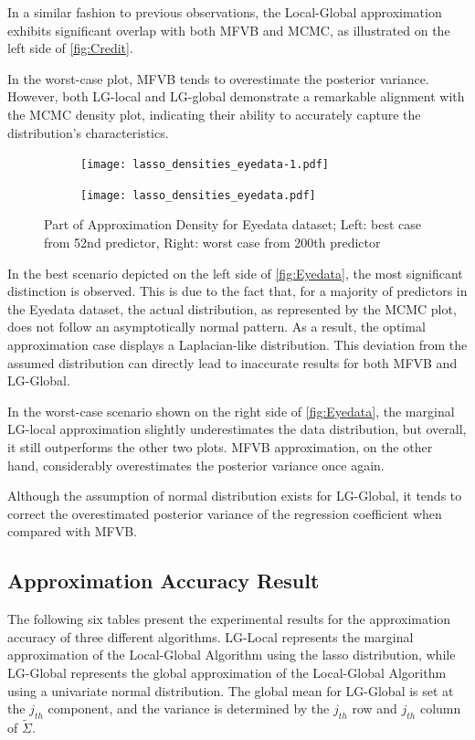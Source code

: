 In a similar fashion to previous observations, the Local-Global approximation exhibits significant overlap with both MFVB and MCMC, as illustrated on the left side of \autoref{fig:Credit}.

In the worst-case plot, MFVB tends to overestimate the posterior variance. However, both LG-local and LG-global demonstrate a remarkable alignment with the MCMC density plot, indicating their ability to accurately capture the distribution's characteristics.

\begin{figure}[h]
	\begin{subfigure}{0.5\textwidth}
		\centering
		\texttt{[image: lasso\_densities\_eyedata-1.pdf]}
	\end{subfigure}
	\begin{subfigure}{0.5\textwidth}
		\texttt{[image: lasso\_densities\_eyedata.pdf]}
	\end{subfigure}
	\caption{Part of Approximation Density for Eyedata dataset; Left: best case from 52nd predictor, Right: worst case from 200th predictor}
	\label{fig:Eyedata}
\end{figure}

In the best scenario depicted on the left side of \autoref{fig:Eyedata}, the most significant distinction is observed. This is due to the fact that, for a majority of predictors in the Eyedata dataset, the actual distribution, as represented by the MCMC plot, does not follow an asymptotically normal pattern. As a result, the optimal approximation case displays a Laplacian-like distribution. This deviation from the assumed distribution can directly lead to inaccurate results for both MFVB and LG-Global.

In the worst-case scenario shown on the right side of \autoref{fig:Eyedata}, the marginal LG-local approximation slightly underestimates the data distribution, but overall, it still outperforms the other two plots. MFVB approximation, on the other hand, considerably overestimates the posterior variance once again.

Although the assumption of normal distribution exists for LG-Global, it tends to correct the overestimated posterior variance of the regression coefficient when compared with MFVB. 

\subsection{Approximation Accuracy Result}
The following six tables present the experimental results for the approximation accuracy of three different algorithms. LG-Local represents the marginal approximation of the Local-Global Algorithm using the lasso distribution, while LG-Global represents the global approximation of the Local-Global Algorithm using a univariate normal distribution. The global mean for LG-Global is set at the $j_{th}$ component, and the variance is determined by the $j_{th}$ row and $j_{th}$ column of $\tilde{\Sigma}$.


